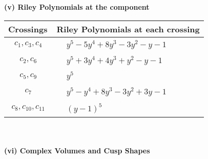\documentclass[1p]{elsarticle_modified}
\theoremstyle{definition}
\begin{document}
\newpage\renewcommand{\arraystretch}{1}
\flushleft \textbf{(v) Riley Polynomials at the component}\newline \\
\begin{tabular}{m{50pt}|m{274pt}}
Crossings & \hspace{64pt}Riley Polynomials at each crossing \\
\hline $$\begin{aligned}c_{1},c_{3},c_{4}\end{aligned}$$&$\begin{aligned}
&y^5-5 y^4+8 y^3-3 y^2- y-1
\end{aligned}$\\
\hline $$\begin{aligned}c_{2},c_{6}\end{aligned}$$&$\begin{aligned}
&y^5+3 y^4+4 y^3+y^2- y-1
\end{aligned}$\\
\hline $$\begin{aligned}c_{5},c_{9}\end{aligned}$$&$\begin{aligned}
&y^5
\end{aligned}$\\
\hline $$\begin{aligned}c_{7}\end{aligned}$$&$\begin{aligned}
&y^5- y^4+8 y^3-3 y^2+3 y-1
\end{aligned}$\\
\hline $$\begin{aligned}c_{8},c_{10},c_{11}\end{aligned}$$&$\begin{aligned}
&(y-1)^5
\end{aligned}$\\
\hline
\end{tabular}\\~\\
\newpage\flushleft \textbf{(vi) Complex Volumes and Cusp Shapes}
\end{document}
